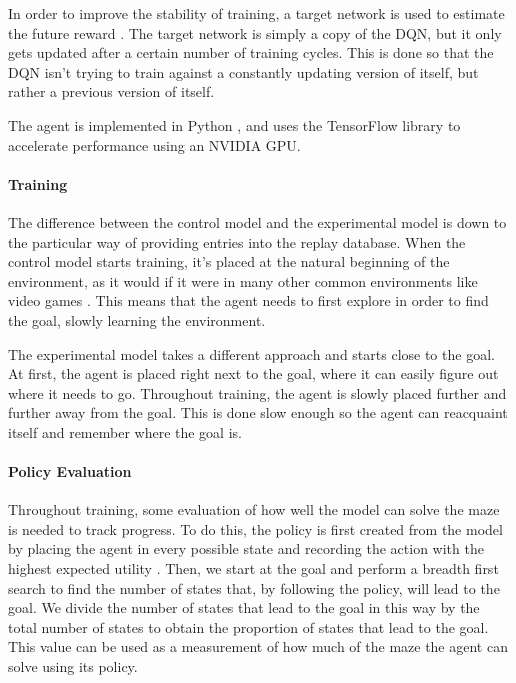 \documentclass[12pt]{article}
\begin{document}
In order to improve the stability of training, a target network is used to estimate the future reward \cite{article_human_level_control_deep_reinforcement_learning}.
The target network is simply a copy of the DQN, but it only gets updated after a certain number of training cycles.
This is done so that the DQN isn't trying to train against a constantly updating version of itself, but rather a previous version of itself.

The agent is implemented in Python \cite{lang_python}, and uses the TensorFlow \cite{lib_tensorflow} library to accelerate performance using an NVIDIA GPU.

\paragraph{Training} 
The difference between the control model and the experimental model is down to the particular way of providing entries into the replay database.
When the control model starts training, it's placed at the natural beginning of the environment, as it would if it were in many other common environments like video games \cite{article_reinforcement_learning_survey}.
This means that the agent needs to first explore in order to find the goal, slowly learning the environment.

The experimental model takes a different approach and starts close to the goal.
At first, the agent is placed right next to the goal, where it can easily figure out where it needs to go.
Throughout training, the agent is slowly placed further and further away from the goal.
This is done slow enough so the agent can reacquaint itself and remember where the goal is.


\paragraph{Policy Evaluation}

Throughout training, some evaluation of how well the model can solve the maze is needed to track progress.
To do this, the policy is first created from the model by placing the agent in every possible state and recording the action with the highest expected utility \cite{article_reinforcement_learning_survey}.
Then, we start at the goal and perform a breadth first search to find the number of states that, by following the policy, will lead to the goal.
We divide the number of states that lead to the goal in this way by the total number of states to obtain the proportion of states that lead to the goal.
This value can be used as a measurement of how much of the maze the agent can solve using its policy.
\end{document}

